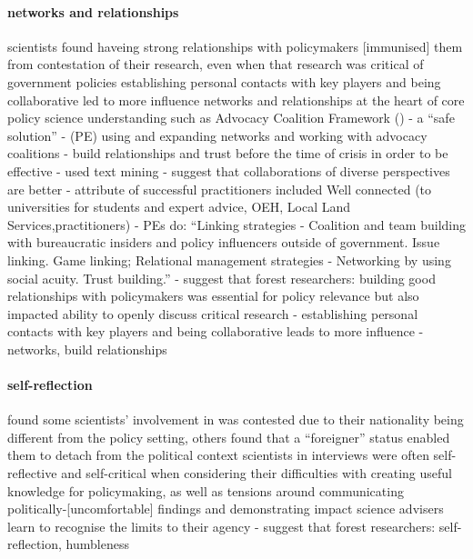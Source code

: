 \paragraph{networks and relationships}
\cite{OjanenBKP2021} scientists found haveing strong relationships with policymakers [immunised] them from contestation of their research, even when that research was critical of government policies
\cite{SaxonbergSL2023} establishing personal contacts with key players and being collaborative led to more influence
networks and relationships at the heart of core policy science understanding such as Advocacy Coalition Framework (\cite{Dowding2018})
\cite{CairneyO2020} - a ``safe solution''
\cite{Mintrom2019} - (PE) using and expanding networks and working with advocacy coalitions
\cite{BollykyP2024} - build relationships and trust before the time of crisis in order to be effective
\cite{ArnoldNG2016} - used text mining
\cite{BoswellS2017} - suggest that collaborations of diverse perspectives are better  
\cite{GogginEtAl2015} - attribute of successful practitioners included Well connected (to universities for students and expert advice, OEH, Local Land Services,practitioners)
\cite{vonMalmborg2024strategies} - PEs do: ``Linking strategies - Coalition and team building with bureaucratic insiders and policy influencers outside of government. Issue linking. Game linking; Relational management strategies - Networking by using social acuity. Trust building.''
\cite{OjanenBKP2021} - suggest that forest researchers: building good relationships with policymakers was essential for policy relevance but also impacted ability to openly discuss critical research
\cite{SaxonbergSL2023} - establishing personal contacts with key players and being collaborative leads to more influence
\cite{ThompsonD2024} - networks, build relationships

\paragraph{self-reflection}
\cite{OjanenBKP2021} found some scientists' involvement in \SPI{} was contested due to their nationality being different from the policy setting, others found that a ``foreigner'' status enabled them to detach from the political context 
\cite{OjanenBKP2021} scientists in interviews were often self-reflective and self-critical when considering their difficulties with creating useful knowledge for policymaking, as well as tensions around communicating politically-[uncomfortable] findings and demonstrating impact
\cite{Obermeister2022} science advisers learn to recognise the limits to their agency
\cite{OjanenBKP2021} - suggest that forest researchers: self-reflection, humbleness
